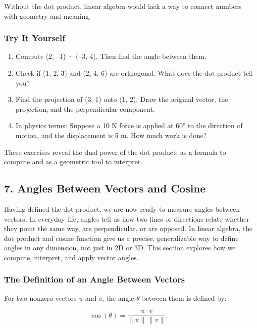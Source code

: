 \documentclass[
  letterpaper,
  DIV=11,
  numbers=noendperiod]{scrreprt}
\providecommand{\tightlist}{%
  \setlength{\itemsep}{0pt}\setlength{\parskip}{0pt}}
\begin{document}
Without the dot product, linear algebra would lack a way to connect
numbers with geometry and meaning.

\subsubsection{Try It Yourself}\label{try-it-yourself-5}

\begin{enumerate}
\def\labelenumi{\arabic{enumi}.}
\tightlist
\item
  Compute (2, --1) · (--3, 4). Then find the angle between them.
\item
  Check if (1, 2, 3) and (2, 4, 6) are orthogonal. What does the dot
  product tell you?
\item
  Find the projection of (3, 1) onto (1, 2). Draw the original vector,
  the projection, and the perpendicular component.
\item
  In physics terms: Suppose a 10 N force is applied at 60° to the
  direction of motion, and the displacement is 5 m. How much work is
  done?
\end{enumerate}

These exercises reveal the dual power of the dot product: as a formula
to compute and as a geometric tool to interpret.

\subsection{7. Angles Between Vectors and
Cosine}\label{angles-between-vectors-and-cosine}

Having defined the dot product, we are now ready to measure angles
between vectors. In everyday life, angles tell us how two lines or
directions relate-whether they point the same way, are perpendicular, or
are opposed. In linear algebra, the dot product and cosine function give
us a precise, generalizable way to define angles in any dimension, not
just in 2D or 3D. This section explores how we compute, interpret, and
apply vector angles.

\subsubsection{The Definition of an Angle Between
Vectors}\label{the-definition-of-an-angle-between-vectors}

For two nonzero vectors \(u\) and \(v\), the angle \(\theta\) between
them is defined by:

\[
\cos(\theta) = \frac{u \cdot v}{\|u\| \, \|v\|}.
\]
\end{document}
